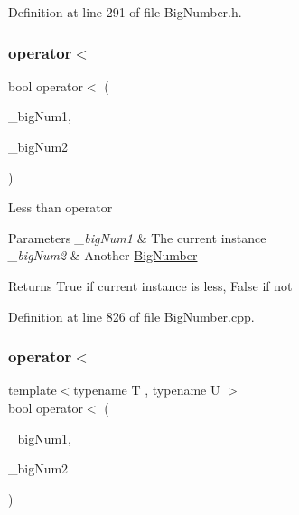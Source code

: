 Definition at line 291 of file Big\+Number.\+h.

\mbox{\label{class_big_nums_1_1_big_number_a5908b93d7477c482d145b878fa003101}} 
\subsubsection{\texorpdfstring{operator$<$}{operator<}\hspace{0.1cm}{\footnotesize\ttfamily [1/2]}}
{\footnotesize\ttfamily bool operator$<$ (\begin{DoxyParamCaption}\item[{const \mbox{\hyperlink{class_big_nums_1_1_big_number}{Big\+Number}} \&}]{\+\_\+big\+Num1,  }\item[{const \mbox{\hyperlink{class_big_nums_1_1_big_number}{Big\+Number}} \&}]{\+\_\+big\+Num2 }\end{DoxyParamCaption})\hspace{0.3cm}{\ttfamily [friend]}}

Less than operator 
\begin{DoxyParams}{Parameters}
{\em \+\_\+big\+Num1} & The current instance \\
\hline
{\em \+\_\+big\+Num2} & Another \mbox{\hyperlink{class_big_nums_1_1_big_number}{Big\+Number}} \\
\hline
\end{DoxyParams}
\begin{DoxyReturn}{Returns}
True if current instance is less, False if not 
\end{DoxyReturn}


Definition at line 826 of file Big\+Number.\+cpp.

\mbox{\label{class_big_nums_1_1_big_number_a8d081ba4f8cf93e90d74dbe013695b1c}} 
\subsubsection{\texorpdfstring{operator$<$}{operator<}\hspace{0.1cm}{\footnotesize\ttfamily [2/2]}}
{\footnotesize\ttfamily template$<$typename T , typename U $>$ \\
bool operator$<$ (\begin{DoxyParamCaption}\item[{const T \&}]{\+\_\+big\+Num1,  }\item[{const U \&}]{\+\_\+big\+Num2 }\end{DoxyParamCaption})\hspace{0.3cm}{\ttfamily [friend]}}



